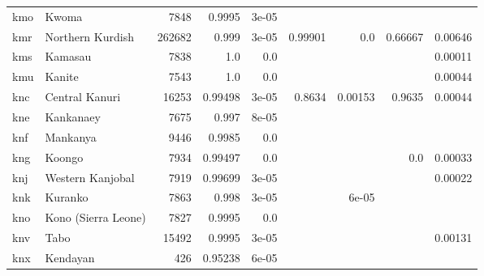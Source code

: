 \documentclass[11pt]{article}
\begin{document}
\begin{table*}[h]
{\begin{tabular}{llrrrrrrr}
kmo         & Kwoma         & 7848         & 0.9995         & 3e-05         &          &          &          &          \\

kmr         & Northern Kurdish         & 262682         & 0.999         & 3e-05         & 0.99901         & 0.0         & 0.66667         & 0.00646         \\

kms         & Kamasau         & 7838         & 1.0         & 0.0         &          &          &          & 0.00011         \\

kmu         & Kanite         & 7543         & 1.0         & 0.0         &          &          &          & 0.00044         \\

knc         & Central Kanuri         & 16253         & 0.99498         & 3e-05         & 0.8634         & 0.00153         & 0.9635         & 0.00044         \\

kne         & Kankanaey         & 7675         & 0.997         & 8e-05         &          &          &          &          \\

knf         & Mankanya         & 9446         & 0.9985         & 0.0         &          &          &          &          \\

kng         & Koongo         & 7934         & 0.99497         & 0.0         &          &          & 0.0         & 0.00033         \\

knj         & Western Kanjobal         & 7919         & 0.99699         & 3e-05         &          &          &          & 0.00022         \\

knk         & Kuranko         & 7863         & 0.998         & 3e-05         &          & 6e-05         &          &          \\

kno         & Kono (Sierra Leone)         & 7827         & 0.9995         & 0.0         &          &          &          &          \\

knv         & Tabo         & 15492         & 0.9995         & 3e-05         &          &          &          & 0.00131         \\

knx         & Kendayan         & 426         & 0.95238         & 6e-05         &          &          &          &          \\


\end{tabular}}
\end{table*}
\end{document}
